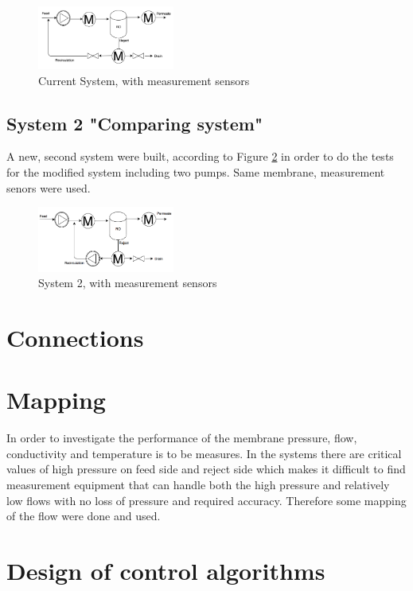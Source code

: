 \begin{figure}[h]
    \centering
    \includegraphics[width=0.4\textwidth]{MeasCurrSys}
    \caption{Current System, with measurement sensors}
    \label{fig:MeasCurrSys}
\end{figure}

\subsection{System 2  "Comparing system"}
A new, second system were built, according to Figure \ref{fig:MeasSys2} in order to do the tests for the modified system including two pumps. Same membrane, measurement senors were used.

\begin{figure}[h]
    \centering
    \includegraphics[width=0.4\textwidth]{MeasSys2}
    \caption{System 2, with measurement sensors}
    \label{fig:MeasSys2}
\end{figure}

\section{Connections} \label{Connections}


\section{Mapping}
In order to investigate the performance of the membrane pressure, flow, conductivity and temperature is to be measures. In the systems there are critical values of high pressure on feed side and reject side which makes it difficult to find measurement equipment that can handle both the high pressure and relatively low flows with no loss of pressure and required accuracy. Therefore some mapping of the flow were done and used.


\section{Design of control algorithms}


